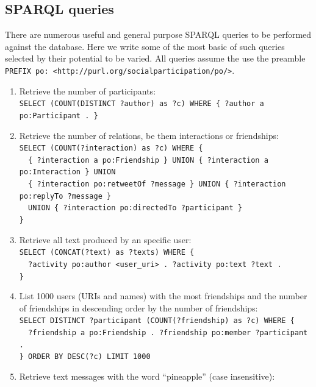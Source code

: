 \documentclass[review]{elsarticle}
\newcommand{\textttt}[1] {\texttt{\footnotesize#1}}
\newcommand{\h} {\hphantom ~ }
\begin{document}
\subsection{SPARQL queries}\label{queries}
There are numerous useful and general purpose SPARQL queries to be performed against the database.
Here we write some of the most basic of such queries selected by their potential to be varied.
All queries assume the use the preamble \textttt{PREFIX po: <http://purl.org/socialparticipation/po/>}.
\begin{enumerate}[leftmargin=0cm]
	\item Retrieve the number of participants:\\
            \textttt{SELECT (COUNT(DISTINCT ?author) as ?c) WHERE \{
            ?author a po:Participant . \} }
	\item Retrieve the number of relations, be them interactions or
            friendships:\\
            \textttt{SELECT (COUNT(?interaction) as ?c) WHERE \{\\
                    \h \{ ?interaction a po:Friendship \} UNION \{ ?interaction
                    a po:Interaction \} UNION\\
                    \h \{ ?interaction po:retweetOf
                    ?message \} UNION \{ ?interaction po:replyTo ?message
                    \}\\
                    \h UNION \{ ?interaction po:directedTo ?participant
                    \}\\ \} }
	\item Retrieve all text produced by an specific user:\\
            \textttt{SELECT (CONCAT(?text) as ?texts) WHERE \{\\
                    \h ?activity po:author <user\_uri> . ?activity po:text ?text .\\
    \}}
        \item List 1000 users (URIs and names) with the most friendships and the number of
            friendships in descending order by the number of friendships:\\
            \textttt{SELECT DISTINCT ?participant (COUNT(?friendship)
            as ?c) WHERE \{\\
                \h ?friendship a po:Friendship . ?friendship po:member ?participant . \\
            \} ORDER BY DESC(?c) LIMIT 1000}
        \item Retrieve text messages with the word ``pineapple'' (case insensitive):\\

\end{enumerate}
\end{document}
